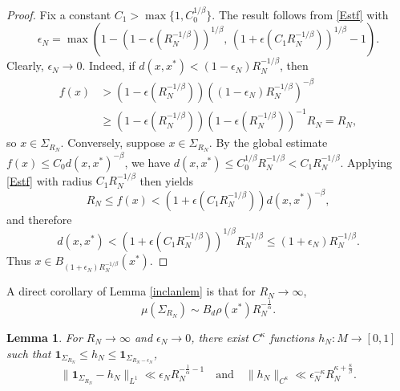 \documentclass[11pt,twoside,a4paper,reqno]{amsart}
\newtheorem{lemma}[theorem]{Lemma}
\def\one{{\mathbf{1}}}
\begin{document}
\begin{proof}
Fix a constant $C_1>\max\{1,C_0^{1/\beta}\}$. The result follows from \eqref{Estf} with
\begin{equation*}
\epsilon_N=\max\left(1-\left(1-\epsilon(R_N^{-1/\beta})\right)^{1/\beta},\,
\left(1+\epsilon(C_1R_N^{-1/\beta})\right)^{1/\beta}-1\right).
\end{equation*}
Clearly, $\epsilon_N\to0$. Indeed, if $d(x,x^*) < (1-\epsilon_N)R_N^{-1/\beta}$, then
\begin{align*}
f(x)&> \left(1-\epsilon(R_N^{-1/\beta})\right)\left((1-\epsilon_N)R_N^{-1/\beta}\right)^{-\beta}\\
&\geq \left(1-\epsilon(R_N^{-1/\beta})\right)\left(1-\epsilon(R_N^{-1/\beta})\right)^{-1}R_N = R_N,
\end{align*}
so $x \in \Sigma_{R_N}$. Conversely, suppose $x\in\Sigma_{R_N}$. By the global estimate
$f(x)\leq C_0d(x,x^*)^{-\beta}$, we have $d(x,x^*)\leq C_0^{1/\beta}R_N^{-1/\beta}<C_1R_N^{-1/\beta}$.
Applying \eqref{Estf} with radius $C_1R_N^{-1/\beta}$ then yields
$$R_N\leq f(x)<\left(1+\epsilon(C_1R_N^{-1/\beta})\right)d(x,x^*)^{-\beta},$$
and therefore
$$d(x,x^*)<\left(1+\epsilon(C_1R_N^{-1/\beta})\right)^{1/\beta}
R_N^{-1/\beta}\leq(1+\epsilon_N)R_N^{-1/\beta}.$$
Thus $x\in B_{(1+\epsilon_N)R_N^{-1/\beta}}(x^*)$.
\end{proof}




A direct corollary of Lemma \ref{inclanlem} is that for $R_N \to \infty$,
\begin{equation}\label{muanlem}
\mu(\Sigma_{R_N}) \sim B_d \rho(x^*) R_N^{-\frac{1}{\alpha}}.
\end{equation}


\begin{lemma}\label{approxanlem}
For $R_N\rightarrow \infty$ and $\epsilon_N \rightarrow 0$, there exist $C^{\kappa}$ functions $h_N:M\rightarrow[0,1]$ such that
$\one_{\Sigma_{R_N}}\leq h_N\leq\one_{\Sigma_{R_N-\epsilon_N}}$,
\begin{equation*}
\|\one_{\Sigma_{R_N}} - h_N\|_{L^1} \ll \epsilon_N R_N^{-\frac{1}{\alpha}-1} \quad \text{and} \quad \|h_N\|_{C^{\kappa}} \ll \epsilon_N^{-\kappa} R_N^{\kappa+\frac{\kappa}{\beta}}.
\end{equation*}
\end{lemma}
\end{document}
